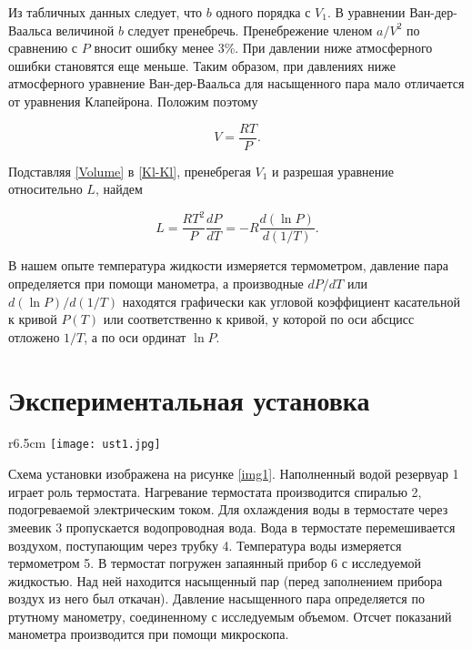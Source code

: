 \documentclass[a4paper,12pt]{article} %
\begin{document}
Из табличных данных следует, что $ b $ одного порядка с $ V_1 $. В уравнении Ван-дер-Ваальса величиной $ b $ следует пренебречь. Пренебрежение членом $ a/V^2 $ по сравнению с $ P $ вносит ошибку менее 3\%. При давлении ниже атмосферного ошибки становятся еще меньше. Таким образом, при давлениях ниже атмосферного уравнение Ван-дер-Ваальса для насыщенного пара мало отличается от уравнения Клапейрона. Положим поэтому

\begin{equation}\label{Volume}
V=\frac{RT}{P}.
\end{equation}

Подставляя \eqref{Volume} в \eqref{Kl-Kl}, пренебрегая $ V_1 $ и разрешая уравнение относительно $ L $, найдем

\begin{equation}\label{final}
L=\frac{RT^2}{P}\frac{dP}{dT}=-R\frac{d(\ln P)}{d(1/T)}.
\end{equation}

В нашем опыте температура жидкости измеряется термометром, давление пара определяется при помощи манометра, а производные $ dP/dT $ или $ d(\ln P)/d(1/T) $ находятся графически как угловой коэффициент касательной к кривой $ P(T) $ или соответственно к кривой, у которой по оси абсцисс отложено $ 1/T $, а по оси ординат $ \ln P $.

\section{Экспериментальная установка}

\begin{wrapfigure}{r}{6.5cm}
	\texttt{[image: ust1.jpg]}
	\caption{\textit{Схема первой установки}}
	\label{img1}
\end{wrapfigure}

Схема установки изображена на рисунке \ref{img1}. Наполненный водой резервуар 1 играет роль термостата. Нагревание термостата производится спиралью 2, подогреваемой электрическим током. Для охлаждения воды в термостате через змеевик 3 пропускается водопроводная вода. Вода в термостате перемешивается воздухом, поступающим через трубку 4. Температура воды измеряется термометром 5. В термостат погружен запаянный прибор 6 с исследуемой жидкостью. Над ней находится насыщенный пар (перед заполнением прибора воздух из него был откачан). Давление насыщенного пара определяется по ртутному манометру, соединенному с исследуемым объемом. Отсчет показаний манометра производится при помощи микроскопа.
\end{document}
